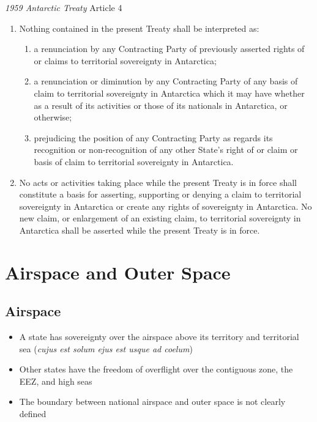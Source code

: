 \begin{conventiondetails}{\textit{1959 Antarctic Treaty} Article 4}
    \flushleft 
    \begin{enumerate}
        \item Nothing contained in the present Treaty shall be interpreted as:
        \begin{enumerate}[label=(\alph*)]
            \item a renunciation by any Contracting Party of previously asserted rights of or claims to territorial sovereignty in Antarctica;
            \item a renunciation or diminution by any Contracting Party of any basis of claim to territorial sovereignty in Antarctica which it may have whether as a result of its activities or those of its nationals in Antarctica, or otherwise;
            \item prejudicing the position of any Contracting Party as regards its recognition or non-recognition of any other State's right of or claim or basis of claim to territorial sovereignty in Antarctica.
        \end{enumerate}
        \item No acts or activities taking place while the present Treaty is in force shall 
        constitute a basis for asserting, supporting or denying a claim to territorial 
        sovereignty in Antarctica or create any rights of sovereignty in Antarctica. No new 
        claim, or enlargement of an existing claim, to territorial sovereignty in Antarctica 
        shall be asserted while the present Treaty is in force.
    \end{enumerate}
\end{conventiondetails}

\section{Airspace and Outer Space}

\subsection{Airspace}
\begin{itemize}
    \item A state has sovereignty over the airspace above its territory and territorial sea (\textit{cujus est solum ejus est usque ad coelum})
    \item Other states have the freedom of overflight over the contiguous zone, the EEZ, and high seas
    \item The boundary between national airspace and outer space is not clearly defined
\end{itemize}

